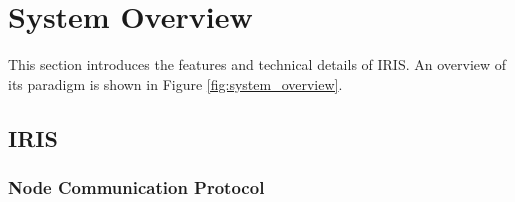\section{System Overview}


This section introduces the features and technical details of IRIS.
An overview of its paradigm is shown in Figure \ref{fig:system_overview}.



\subsection{IRIS}


\subsubsection{Node Communication Protocol}

